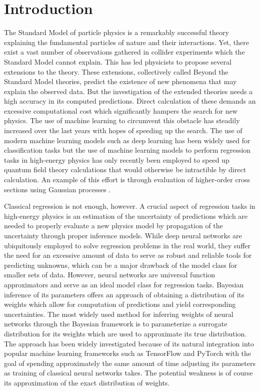 \chapter*{Introduction}


The Standard Model of particle physics is a remarkably successful theory explaining the fundamental particles of nature and their interactions. Yet, there exist a vast number of observations gathered in collider experiments which the Standard Model cannot explain. 
This has led physicists to propose several extensions to the theory.
These extensions, collectively called Beyond the Standard Model theories, predict the existence of new phenomena that may explain the observed data. But the investigation of the extended theories needs a high accuracy in its computed predictions. Direct calculation of these demands an excessive computational cost which significantly hampers the search for new physics. The use of machine learning to 
circumvent this obstacle has steadily increased over the last years with hopes of speeding up the search. The use of modern machine learning models such as deep learning has been widely used for classification tasks but the use of machine learning models to perform regression tasks in high-energy physics has only recently been employed to speed up quantum field theory calculations that would otherwise be intractible by direct calculation. An example of this effort is through evaluation of higher-order cross sections using Gaussian processes \cite{xsec}. 

Classical regression is not enough, however. A crucial aspect of regression tasks in high-energy physics is an estimation of the uncertainty of predictions which are needed to properly evaluate a new physics model by propagation of the uncertainty through proper inference models. While deep neural networks are ubiquitously employed to solve regression problems in the real world, they suffer the need for an excessive amount of data to serve as robust and reliable tools for predicting unknowns, which can be a major drawback of the model class for smaller sets of data. However, neural networks are universal function approximators and serve as an ideal model class for regression tasks. Bayesian inference of its parameters offers an approach of obtaining a distribution of its weights which allow for computation of predictions and yield corresponding uncertainties. The most widely used method for inferring weights of neural networks through the Bayesian framework is to parameterize a surrogate distribution for its weights which are used to approximate its true distribution. The approach has been widely investigated because of its natural integration into popular machine learning frameworks such as TensorFlow and PyTorch with the goal of spending approximately the same amount of time adjusting its parameters as training of classical neural networks takes. The potential weakness is of course its approximation of the exact distribution of weights. 

